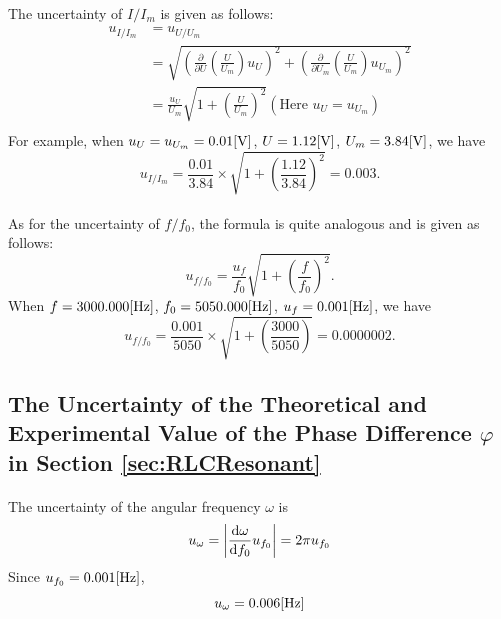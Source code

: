 \documentclass{my_template}
\renewcommand{\phi}{\varphi}
\renewcommand{\d}{{\rm d}}
\begin{document}
    \paragraph{} The uncertainty of $I/I_m$ is given as follows: 
    \begin{equation*}
        \begin{split}
            u_{I/I_m}&=u_{U/U_m}\\
            &=\sqrt{\left(\frac{\partial}{\partial U}\left(\frac{U}{U_m}\right)u_U\right)^2+\left(\frac{\partial}{\partial U_m}\left(\frac{U}{U_m}\right)u_{U_m}\right)^2}\\
            &=\frac{u_U}{U_m}\sqrt{1+\left(\frac{U}{U_m}\right)^2}(\text{Here }u_U=u_{U_m})\\
        \end{split}
    \end{equation*}
    For example, when $u_U=u_{U_m}=0.01[\rm V]$, $U=1.12[\rm V]$, $U_m=3.84[\rm V]$, we have \[u_{I/I_m}=\frac{0.01}{3.84}\times\sqrt{1+\left(\frac{1.12}{3.84}\right)^2}=0.003.\]
    \vspace{-5mm}
    \paragraph{} As for the uncertainty of $f/f_0$, the formula is quite analogous and is given as follows: \[u_{f/f_0}=\frac{u_f}{f_0}\sqrt{1+\left(\frac{f}{f_0}\right)^2}.\]
    When $f=3000.000[\rm Hz]$, $f_0=5050.000[\rm Hz]$, $u_f=0.001[\rm Hz]$, we have $$u_{f/f_0}=\frac{0.001}{5050}\times\sqrt{1+\left(\frac{3000}{5050}\right)}=0.0000002.$$
    \subsection{The Uncertainty of the Theoretical and Experimental Value of the Phase Difference $\phi$ in Section \ref{sec:RLCResonant}}
    \paragraph{} The uncertainty of the angular frequency $\omega$ is $$u_\omega=\left|\frac{\d\omega}{\d f_0}u_{f_0}\right|=2\pi u_{f_0}$$
    Since $u_{f_0}=0.001[\rm Hz]$,$$u_\omega=0.006[\rm Hz] $$
\end{document}
